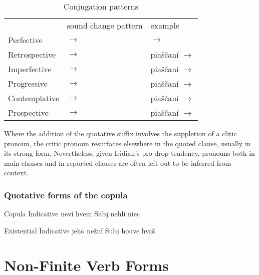 \begin{table}
	\small\centering
	\caption{Conjugation patterns}
	\label{tbl:quotind}
	\begin{tabu} to 0.8\textwidth {YYY}
		\toprule
										&	{\sc sound change pattern}				& {\sc example}\\
										\addlinespace
		\midrule
			\addlinespace
				Perfective 		&
				 $\rightarrow$ 	&
				 $\rightarrow$ \\
			\addlinespace
				Retrospective &
				 $\rightarrow$  &
				pia\v{s}\v{c}an\'i $\rightarrow$ \\
			\addlinespace
				Imperfective &
				 $\rightarrow$  &
				pia\v{s}\v{c}an\'i $\rightarrow$ \\
			\addlinespace
				Progressive &
				 $\rightarrow$  &
				pia\v{s}\v{c}an\'i $\rightarrow$ \\
			\addlinespace
				Contemplative &
				 $\rightarrow$  &
				pia\v{s}\v{c}an\'i $\rightarrow$ \\
			\addlinespace
				Prospective &
				 $\rightarrow$  &
				pia\v{s}\v{c}an\'i $\rightarrow$ \\

	\end{tabu}

\end{table}

Where the addition of the quotative suffix  involves the suppletion of a clitic pronoun, the critic pronoun resurfaces elsewhere in the quoted clause, usually in its strong form. Nevertheless, given Iridian's pro-drop tendency, pronouns both in main clauses and in reported clauses are often left out to be inferred from context.

\subsubsection{Quotative forms of the copula}

Copula
Indicative
nev\'i
hvem
Subj
nehl\'i
niec

Existential
Indicative
jeho
ne\v{z}n\'i
Subj
houve
hva\v{s}


\section{Non-Finite Verb Forms}

